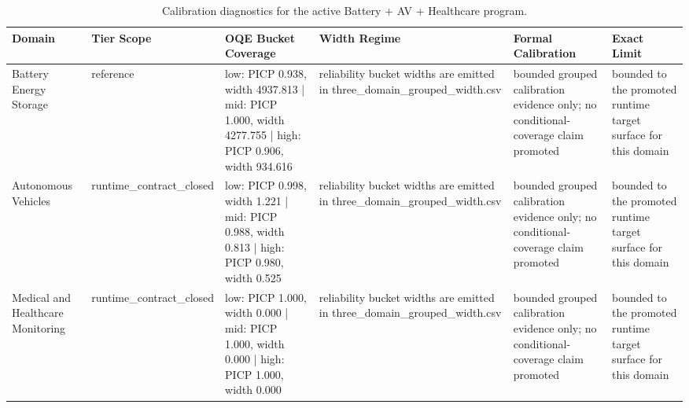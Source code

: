 \begin{table}[htbp]
\centering
\caption{Calibration diagnostics for the active Battery + AV + Healthcare program.}
\label{tbl:orius-calibration-diagnostics}
\begin{tabular}{llllll}
\toprule
Domain & Tier Scope & OQE Bucket Coverage & Width Regime & Formal Calibration & Exact Limit\\
\midrule
Battery Energy Storage & reference & low: PICP 0.938, width 4937.813 | mid: PICP 1.000, width 4277.755 | high: PICP 0.906, width 934.616 & reliability bucket widths are emitted in three\_domain\_grouped\_width.csv & bounded grouped calibration evidence only; no conditional-coverage claim promoted & bounded to the promoted runtime target surface for this domain\\
Autonomous Vehicles & runtime\_contract\_closed & low: PICP 0.998, width 1.221 | mid: PICP 0.988, width 0.813 | high: PICP 0.980, width 0.525 & reliability bucket widths are emitted in three\_domain\_grouped\_width.csv & bounded grouped calibration evidence only; no conditional-coverage claim promoted & bounded to the promoted runtime target surface for this domain\\
Medical and Healthcare Monitoring & runtime\_contract\_closed & low: PICP 1.000, width 0.000 | mid: PICP 1.000, width 0.000 | high: PICP 1.000, width 0.000 & reliability bucket widths are emitted in three\_domain\_grouped\_width.csv & bounded grouped calibration evidence only; no conditional-coverage claim promoted & bounded to the promoted runtime target surface for this domain\\
\bottomrule
\end{tabular}
\end{table}
